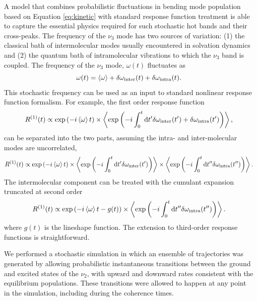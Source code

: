 \documentclass[%
  class = book,%
  crop = false,%
  float = true,%
  multi = true,%
  preview = false,%
]{standalone}
\begin{document}
{A model that combines probabilistic fluctuations in bending mode population based on Equation \ref{eq:kinetic} with standard response function treatment is able to capture the essential physics required for such stochastic hot bands and their cross-peaks. The frequency of the \(\nu_3\) mode has two sources of variation: (1) the classical bath of intermolecular modes usually encountered in solvation dynamics and (2) the quantum bath of intramolecular vibrations to which the \(\nu_3\) band is coupled. The frequency of the \(\nu_3\) mode, \(\omega(t)\) fluctuates as
\begin{equation}
  \label{eq:stochastic_frequency}
  \omega(t) = \braket{\omega} + \delta\omega_\mathrm{inter}(t) + \delta\omega_\mathrm{intra}(t).
\end{equation}
This stochastic frequency can be used as an input to standard nonlinear response function formalism. For example, the first order response function
\begin{equation}
  \label{eq:R1_1}
  R^{(1)}(t) \propto \exp{\left( -i\braket{\omega} t \right)} \times \Braket{ \exp{\left(-i\int_0^t \mathrm{d}t' \delta\omega_\mathrm{inter}(t') + \delta\omega_\mathrm{intra}(t')\right)} },
\end{equation}
can be separated into the two parts, assuming the intra- and inter-molecular modes are uncorrelated,
\begin{equation}\label{eq:R1_2}
  R^{(1)}(t) \propto \exp{\left( -i \braket{\omega} t \right)} \times \Braket{ \exp{\left( -i\int_0^t \mathrm{d}t' \delta\omega_\mathrm{inter}(t') \right)} } \times \Braket{  \exp{\left( -i\int_0^t \mathrm{d}t''\delta\omega_\mathrm{intra}(t'') \right)} }.
\end{equation}
The intermolecular component can be treated with the cumulant expansion truncated at second order
\begin{equation}
  \label{eq:R1_2b}
  R^{(1)}(t) \propto \exp{\left( -i \Braket{\omega} {t} - g(t) \right) } \times \Braket{ \exp{ \left( -i\int_0^t \mathrm{d}t''\delta\omega_\mathrm{intra}(t'') \right)} }.
\end{equation}
where \(g(t)\) is the lineshape function. The extension to third-order response functions is straightforward.

We performed a stochastic simulation in which an ensemble of trajectories was generated by allowing probabilistic instantaneous transitions between the ground and excited states of the \(\nu_2\), with upward and downward rates consistent with the equilibrium populations. These transitions were allowed to happen at any point in the simulation, including during the coherence times.

}
\end{document}
